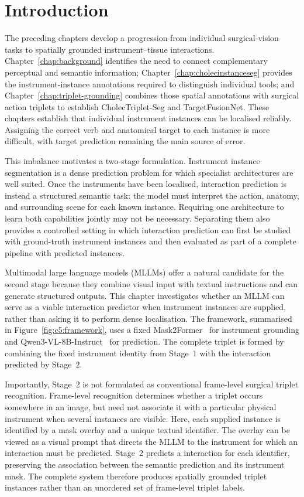\section{Introduction}
\label{sec:c5:introduction}

The preceding chapters develop a progression from individual surgical-vision tasks to spatially grounded instrument--tissue interactions. Chapter~\ref{chap:background} identifies the need to connect complementary perceptual and semantic information; Chapter~\ref{chap:cholecinstanceseg} provides the instrument-instance annotations required to distinguish individual tools; and Chapter~\ref{chap:triplet-grounding} combines those spatial annotations with surgical action triplets to establish CholecTriplet-Seg and TargetFusionNet. These chapters establish that individual instrument instances can be localised reliably. Assigning the correct verb and anatomical target to each instance is more difficult, with target prediction remaining the main source of error.

This imbalance motivates a two-stage formulation. Instrument instance segmentation is a dense prediction problem for which specialist architectures are well suited. Once the instruments have been localised, interaction prediction is instead a structured semantic task: the model must interpret the action, anatomy, and surrounding scene for each known instance. Requiring one architecture to learn both capabilities jointly may not be necessary. Separating them also provides a controlled setting in which interaction prediction can first be studied with ground-truth instrument instances and then evaluated as part of a complete pipeline with predicted instances.

Multimodal large language models (MLLMs) offer a natural candidate for the second stage because they combine visual input with textual instructions and can generate structured outputs. This chapter investigates whether an MLLM can serve as a viable interaction predictor when instrument instances are supplied, rather than asking it to perform dense localisation. The framework, summarised in Figure~\ref{fig:c5:framework}, uses a fixed Mask2Former~\cite{cheng2022masked} for instrument grounding and Qwen3-VL-8B-Instruct~\cite{bai2025qwen3vl} for \vtpair prediction. The complete triplet is formed by combining the fixed instrument identity from Stage~1 with the interaction predicted by Stage~2.

Importantly, Stage~2 is not formulated as conventional frame-level surgical triplet recognition. Frame-level recognition determines whether a triplet occurs somewhere in an image, but need not associate it with a particular physical instrument when several instances are visible. Here, each supplied instance is identified by a mask overlay and a unique textual identifier. The overlay can be viewed as a visual prompt that directs the MLLM to the instrument for which an interaction must be predicted. Stage~2 predicts a \vtpair interaction for each identifier, preserving the association between the semantic prediction and its instrument mask. The complete system therefore produces spatially grounded triplet instances rather than an unordered set of frame-level triplet labels.

